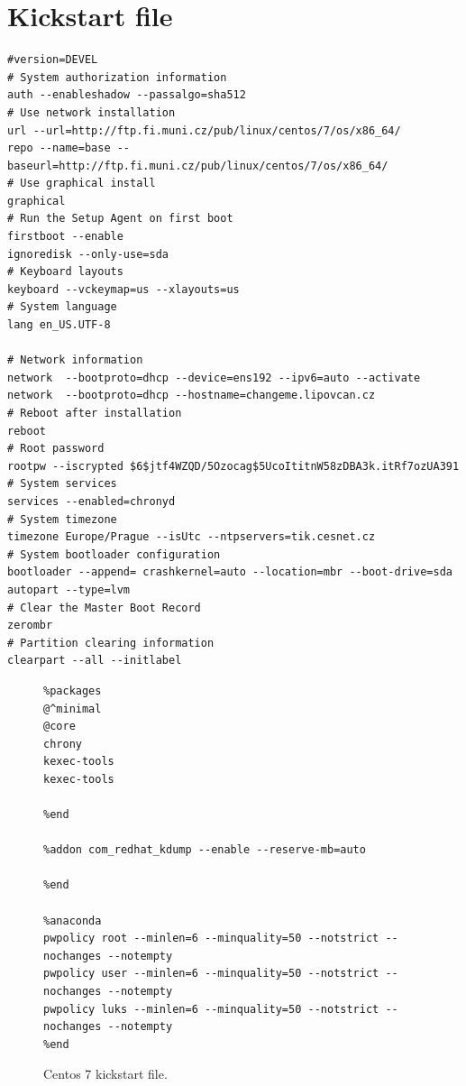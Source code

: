 \documentclass[
  printed, %
  table,   %
  lof,     %
  lot,     %
           oneside, color
]{fithesis3}
\begin{document}
\chapter{Kickstart file}
\label{kickstart}
\begin{lstlisting}
#version=DEVEL
# System authorization information
auth --enableshadow --passalgo=sha512
# Use network installation
url --url=http://ftp.fi.muni.cz/pub/linux/centos/7/os/x86_64/
repo --name=base --baseurl=http://ftp.fi.muni.cz/pub/linux/centos/7/os/x86_64/
# Use graphical install
graphical
# Run the Setup Agent on first boot
firstboot --enable
ignoredisk --only-use=sda
# Keyboard layouts
keyboard --vckeymap=us --xlayouts=us
# System language
lang en_US.UTF-8

# Network information
network  --bootproto=dhcp --device=ens192 --ipv6=auto --activate
network  --bootproto=dhcp --hostname=changeme.lipovcan.cz
# Reboot after installation
reboot
# Root password
rootpw --iscrypted $6$jtf4WZQD/5Ozocag$5UcoItitnW58zDBA3k.itRf7ozUA391
# System services
services --enabled=chronyd
# System timezone
timezone Europe/Prague --isUtc --ntpservers=tik.cesnet.cz
# System bootloader configuration
bootloader --append= crashkernel=auto --location=mbr --boot-drive=sda
autopart --type=lvm
# Clear the Master Boot Record
zerombr
# Partition clearing information
clearpart --all --initlabel
\end{lstlisting}
\newpage
\begin{figure}[H]
\begin{lstlisting}
%packages
@^minimal
@core
chrony
kexec-tools
kexec-tools

%end

%addon com_redhat_kdump --enable --reserve-mb=auto

%end

%anaconda
pwpolicy root --minlen=6 --minquality=50 --notstrict --nochanges --notempty
pwpolicy user --minlen=6 --minquality=50 --notstrict --nochanges --notempty
pwpolicy luks --minlen=6 --minquality=50 --notstrict --nochanges --notempty
%end
\end{lstlisting}


\center
\caption{Centos 7 kickstart file.}
\label{fig:kickstart}
\end{figure}



\endgroup
\end{document}
